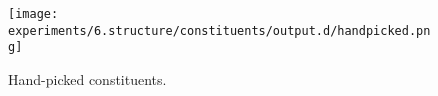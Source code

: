\begin{figure}
\texttt{[image: experiments/6.structure/constituents/output.d/handpicked.png]}
\caption[Hand-picked constituents]{Hand-picked constituents.}
\label{fig-constituents-handpicked}
\end{figure}








